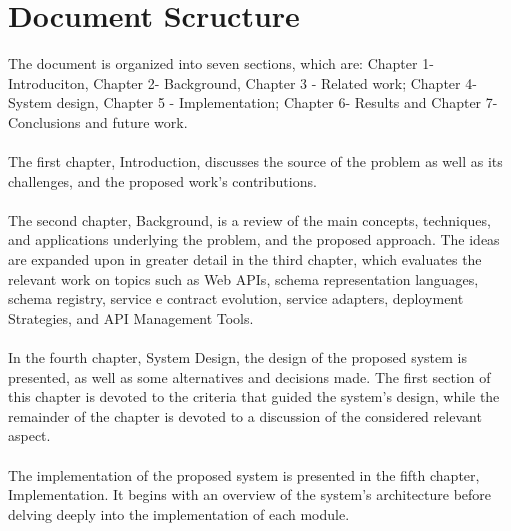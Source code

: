 \section{Document Scructure} %
\label{sec:document_structure}

The document is organized into seven sections, which are: Chapter 1-Introduciton, Chapter 2-
Background, Chapter 3 - Related work; Chapter 4-System design, Chapter 5 - Implementation;
Chapter 6- Results and Chapter 7- Conclusions and future work.

\paragraph{}

The first chapter, Introduction, discusses the source of the problem as well as its challenges,
and the proposed work's contributions.

\paragraph{}

The second chapter, Background, is a review of the main concepts, techniques, and
applications underlying the problem, and the proposed approach.
The ideas are expanded upon in greater detail in the third chapter, which evaluates the relevant work on topics such as
Web APIs, schema representation languages, schema registry, service e contract evolution,
service adapters, deployment Strategies, and API Management Tools.

\paragraph{}

In the fourth chapter, System Design, the design of the proposed system is presented, as well
as some alternatives and decisions made.
The first section of this chapter is devoted to the
criteria that guided the system's design, while the remainder of the chapter is devoted to a
discussion of the considered relevant aspect.

\paragraph{}

The implementation of the proposed system is presented in the fifth chapter, Implementation.
It begins with an overview of the system's architecture before delving deeply into the implementation of each module.

